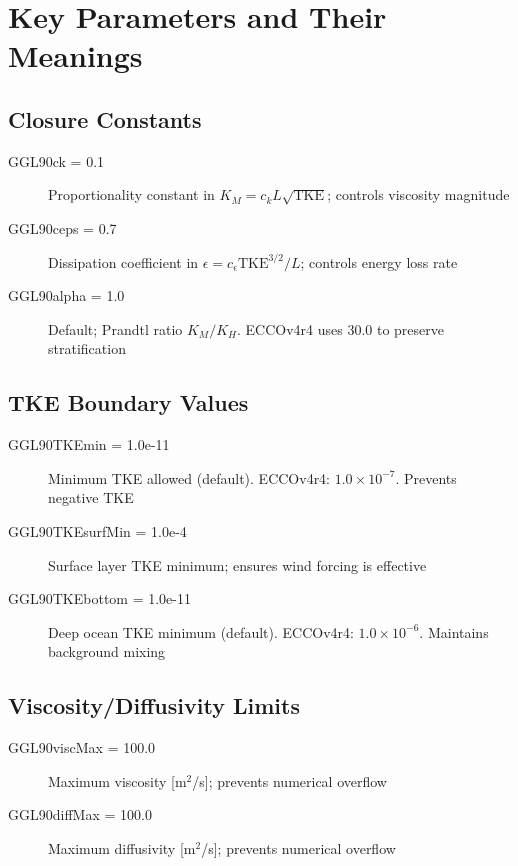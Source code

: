 \documentclass[11pt, a4paper]{article}
\begin{document}
\section{Key Parameters and Their Meanings}

\subsection{Closure Constants}

\begin{description}
    \item[GGL90ck = 0.1] Proportionality constant in $K_M = c_k L \sqrt{\text{TKE}}$; controls viscosity magnitude
    \item[GGL90ceps = 0.7] Dissipation coefficient in $\epsilon = c_{\epsilon} \text{TKE}^{3/2}/L$; controls energy loss rate
    \item[GGL90alpha = 1.0] Default; Prandtl ratio $K_M/K_H$. ECCOv4r4 uses 30.0 to preserve stratification
\end{description}

\subsection{TKE Boundary Values}

\begin{description}
    \item[GGL90TKEmin = 1.0e-11] Minimum TKE allowed (default). ECCOv4r4: $1.0 \times 10^{-7}$. Prevents negative TKE
    \item[GGL90TKEsurfMin = 1.0e-4] Surface layer TKE minimum; ensures wind forcing is effective
    \item[GGL90TKEbottom = 1.0e-11] Deep ocean TKE minimum (default). ECCOv4r4: $1.0 \times 10^{-6}$. Maintains background mixing
\end{description}

\subsection{Viscosity/Diffusivity Limits}

\begin{description}
    \item[GGL90viscMax = 100.0] Maximum viscosity [m$^2$/s]; prevents numerical overflow
    \item[GGL90diffMax = 100.0] Maximum diffusivity [m$^2$/s]; prevents numerical overflow
\end{description}
\end{document}
